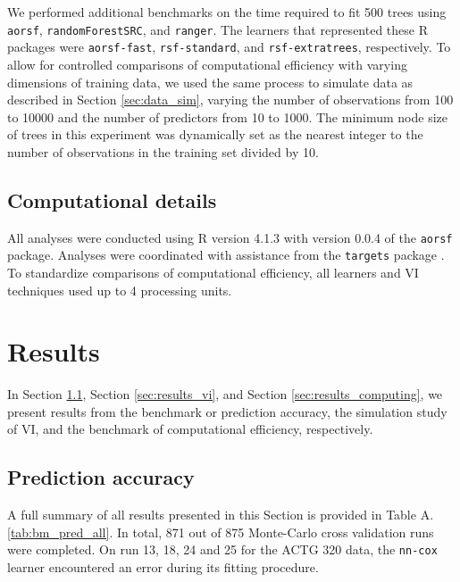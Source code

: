 \documentclass[12pt]{article}\usepackage[]{graphicx}\usepackage[]{xcolor}
\newcommand{\secref}[1]{Section \ref{#1}}
\newcommand{\tabrefAppendix}[1]{Table A.\ref{#1}}
\begin{document}
We performed additional benchmarks on the time required to fit 500 trees using \texttt{aorsf}, \texttt{randomForestSRC}, and \texttt{ranger}. The learners that represented these R packages were \texttt{aorsf-fast}, \texttt{rsf-standard}, and \texttt{rsf-extratrees}, respectively. To allow for controlled comparisons of computational efficiency with varying dimensions of training data, we used the same process to simulate data as described in \secref{sec:data_sim}, varying the number of observations from 100 to 10000 and the number of predictors from 10 to 1000. The minimum node size of trees in this experiment was dynamically set as the nearest integer to the number of observations in the training set divided by 10.

\subsection{Computational details} \label{sec:computing}

All analyses were conducted using R version 4.1.3 with version 0.0.4 of the \texttt{aorsf} \citep{jaeger2022aorsf} package. Analyses were coordinated with assistance from the \texttt{targets} package \citep{targets}. To standardize comparisons of computational efficiency, all learners and VI techniques used up to 4 processing units.


\section{Results} \label{sec:results}

In \secref{sec:results_pred}, \secref{sec:results_vi}, and \secref{sec:results_computing}, we present results from the benchmark or prediction accuracy, the simulation study of VI, and the benchmark of computational efficiency, respectively.

\subsection{Prediction accuracy} \label{sec:results_pred}

A full summary of all results presented in this Section is provided in \tabrefAppendix{tab:bm_pred_all}. In total, 871 out of 875 Monte-Carlo cross validation runs were completed. On run 13, 18, 24 and 25 for the ACTG 320 data, the \texttt{nn-cox} learner encountered an error during its fitting procedure.
\end{document}
